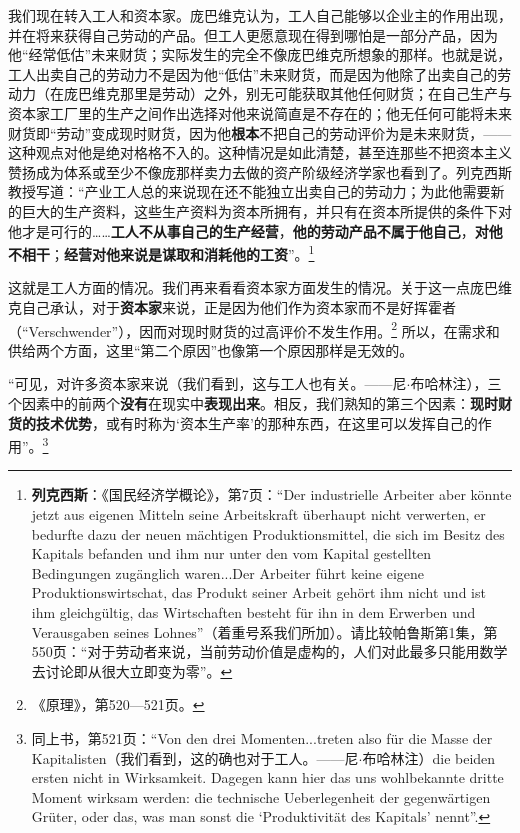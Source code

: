 \documentclass[fontset=fandol, a4paper, 12pt, openright]{ctexbook}
\begin{document}
我们现在转入工人和资本家。庞巴维克认为，工人自己能够以企业主的作用出现，并在将来获得自己劳动的产品。但工人更愿意现在得到哪怕是一部分产品，因为他“经常低估”未来财货；实际发生的完全不像庞巴维克所想象的那样。也就是说，工人出卖自己的劳动力不是因为他“低估”未来财货，而是因为他除了出卖自己的劳动力（在庞巴维克那里是劳动）之外，别无可能获取其他任何财货；在自己生产与资本家工厂里的生产之间作出选择对他来说简直是不存在的；他无任何可能将未来财货即“劳动”变成现时财货，因为他\textbf{根本}不把自己的劳动评价为是未来财货，——这种观点对他是绝对格格不入的。这种情况是如此清楚，甚至连那些不把资本主义赞扬成为体系或至少不像庞那样卖力去做的资产阶级经济学家也看到了。列克西斯教授写道：“产业工人总的来说现在还不能独立出卖自己的劳动力；为此他需要新的巨大的生产资料，这些生产资料为资本所拥有，并只有在资本所提供的条件下对他才是可行的……\textbf{工人不从事自己的生产经营}，\textbf{他的劳动产品不属于他自己}，\textbf{对他不相干}；\textbf{经营对他来说是谋取和消耗他的工资}”。\footnote{\textbf{列克西斯}：《国民经济学概论》，第7页：“Der industrielle Arbeiter aber k\"{o}nnte jetzt aus eigenen Mitteln seine Arbeitskraft \"{u}berhaupt nicht verwerten, er bedurfte dazu der neuen m\"{a}chtigen Produktionsmittel, die sich im Besitz des Kapitals befanden und ihm nur unter den vom Kapital gestellten Bedingungen zug\"{a}nglich waren...Der Arbeiter f\"{u}hrt keine eigene Produktionswirtschat, das Produkt seiner Arbeit geh\"{o}rt ihm nicht und ist ihm gleichg\"{u}ltig, das Wirtschaften besteht f\"{u}r ihn in dem Erwerben und Verausgaben seines Lohnes”（着重号系我们所加）。请比较帕鲁斯第1集，第550页：“对于劳动者来说，当前劳动价值是虚构的，人们对此最多只能用数学去讨论即从很大立即变为零”。}

这就是工人方面的情况。我们再来看看资本家方面发生的情况。关于这一点庞巴维克自己承认，对于\textbf{资本家}来说，正是因为他们作为资本家而不是好挥霍者（“Verschwender”），因而对现时财货的过高评价不发生作用。\footnote{《原理》，第520—521页。} 所以，在需求和供给两个方面，这里“第二个原因”也像第一个原因那样是无效的。

“可见，对许多资本家来说（我们看到，这与工人也有关。——尼$\cdot$布哈林注），三个因素中的前两个\textbf{没有}在现实中\textbf{表现出来}。相反，我们熟知的第三个因素：\textbf{现时财货的技术优势}，或有时称为‘资本生产率’的那种东西，在这里可以发挥自己的作用”。\footnote{同上书，第521页：“Von den drei Momenten...treten also f\"{u}r die Masse der Kapitalisten（我们看到，这的确也对于工人。——尼$\cdot$布哈林注）die beiden ersten nicht in Wirksamkeit. Dagegen kann hier das uns wohlbekannte dritte Moment wirksam werden: die technische Ueberlegenheit der gegenw\"{a}rtigen Gr\"{u}ter, oder das, was man sonst die `Produktivit\"{a}t des Kapitals' nennt”.}
\end{document}
